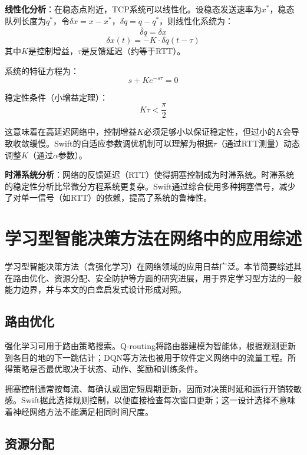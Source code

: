 \textbf{线性化分析}：在稳态点附近，TCP系统可以线性化。设稳态发送速率为$x^*$，稳态队列长度为$q^*$，令$\delta x = x - x^*$，$\delta q = q - q^*$，则线性化系统为：
\begin{equation}
\dot{\delta q} = \delta x
\end{equation}
\begin{equation}
\delta x(t) = -K \cdot \delta q(t - \tau)
\end{equation}
其中$K$是控制增益，$\tau$是反馈延迟（约等于RTT）。

系统的特征方程为：
\begin{equation}
s + K e^{-s\tau} = 0
\end{equation}

稳定性条件（小增益定理）：
\begin{equation}
K \tau < \frac{\pi}{2}
\end{equation}

这意味着在高延迟网络中，控制增益$K$必须足够小以保证稳定性，但过小的$K$会导致收敛缓慢。Swift的自适应参数调优机制可以理解为根据$\tau$（通过RTT测量）动态调整$K$（通过$\alpha$参数）。

\textbf{时滞系统分析}：网络的反馈延迟（RTT）使得拥塞控制成为时滞系统。时滞系统的稳定性分析比常微分方程系统更复杂。Swift通过综合使用多种拥塞信号，减少了对单一信号（如RTT）的依赖，提高了系统的鲁棒性。

\section{学习型智能决策方法在网络中的应用综述}

学习型智能决策方法（含强化学习）在网络领域的应用日益广泛。本节简要综述其在路由优化、资源分配、安全防护等方面的研究进展，用于界定学习型方法的一般能力边界，并与本文的白盒启发式设计形成对照。

\subsection{路由优化}

强化学习可用于路由策略搜索。Q-routing将路由器建模为智能体，根据观测更新到各目的地的下一跳估计；DQN等方法也被用于软件定义网络中的流量工程。所得策略是否最优取决于状态、动作、奖励和训练条件。

拥塞控制通常按每流、每确认或固定短周期更新，因而对决策时延和运行开销较敏感。Swift据此选择规则控制，以便直接检查每次窗口更新；这一设计选择不意味着神经网络方法不能满足相同时间尺度。

\subsection{资源分配}

